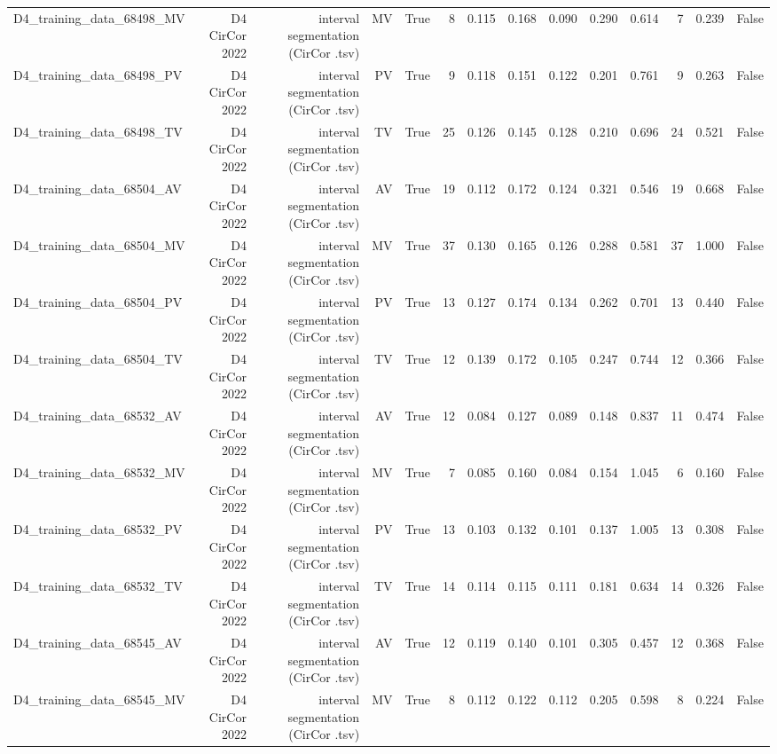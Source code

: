 \begin{table}[htbp]
\begin{tabular}{lrrrrrrrrrrrrr}
    D4\_training\_data\_68498\_MV & D4 CirCor 2022 & interval segmentation (CirCor .tsv) & MV & True & 8 & 0.115 & 0.168 & 0.090 & 0.290 & 0.614 & 7 & 0.239 & False \\
    D4\_training\_data\_68498\_PV & D4 CirCor 2022 & interval segmentation (CirCor .tsv) & PV & True & 9 & 0.118 & 0.151 & 0.122 & 0.201 & 0.761 & 9 & 0.263 & False \\
    D4\_training\_data\_68498\_TV & D4 CirCor 2022 & interval segmentation (CirCor .tsv) & TV & True & 25 & 0.126 & 0.145 & 0.128 & 0.210 & 0.696 & 24 & 0.521 & False \\
    D4\_training\_data\_68504\_AV & D4 CirCor 2022 & interval segmentation (CirCor .tsv) & AV & True & 19 & 0.112 & 0.172 & 0.124 & 0.321 & 0.546 & 19 & 0.668 & False \\
    D4\_training\_data\_68504\_MV & D4 CirCor 2022 & interval segmentation (CirCor .tsv) & MV & True & 37 & 0.130 & 0.165 & 0.126 & 0.288 & 0.581 & 37 & 1.000 & False \\
    D4\_training\_data\_68504\_PV & D4 CirCor 2022 & interval segmentation (CirCor .tsv) & PV & True & 13 & 0.127 & 0.174 & 0.134 & 0.262 & 0.701 & 13 & 0.440 & False \\
    D4\_training\_data\_68504\_TV & D4 CirCor 2022 & interval segmentation (CirCor .tsv) & TV & True & 12 & 0.139 & 0.172 & 0.105 & 0.247 & 0.744 & 12 & 0.366 & False \\
    D4\_training\_data\_68532\_AV & D4 CirCor 2022 & interval segmentation (CirCor .tsv) & AV & True & 12 & 0.084 & 0.127 & 0.089 & 0.148 & 0.837 & 11 & 0.474 & False \\
    D4\_training\_data\_68532\_MV & D4 CirCor 2022 & interval segmentation (CirCor .tsv) & MV & True & 7 & 0.085 & 0.160 & 0.084 & 0.154 & 1.045 & 6 & 0.160 & False \\
    D4\_training\_data\_68532\_PV & D4 CirCor 2022 & interval segmentation (CirCor .tsv) & PV & True & 13 & 0.103 & 0.132 & 0.101 & 0.137 & 1.005 & 13 & 0.308 & False \\
    D4\_training\_data\_68532\_TV & D4 CirCor 2022 & interval segmentation (CirCor .tsv) & TV & True & 14 & 0.114 & 0.115 & 0.111 & 0.181 & 0.634 & 14 & 0.326 & False \\
    D4\_training\_data\_68545\_AV & D4 CirCor 2022 & interval segmentation (CirCor .tsv) & AV & True & 12 & 0.119 & 0.140 & 0.101 & 0.305 & 0.457 & 12 & 0.368 & False \\
    D4\_training\_data\_68545\_MV & D4 CirCor 2022 & interval segmentation (CirCor .tsv) & MV & True & 8 & 0.112 & 0.122 & 0.112 & 0.205 & 0.598 & 8 & 0.224 & False \\

\end{tabular}
\end{table}

